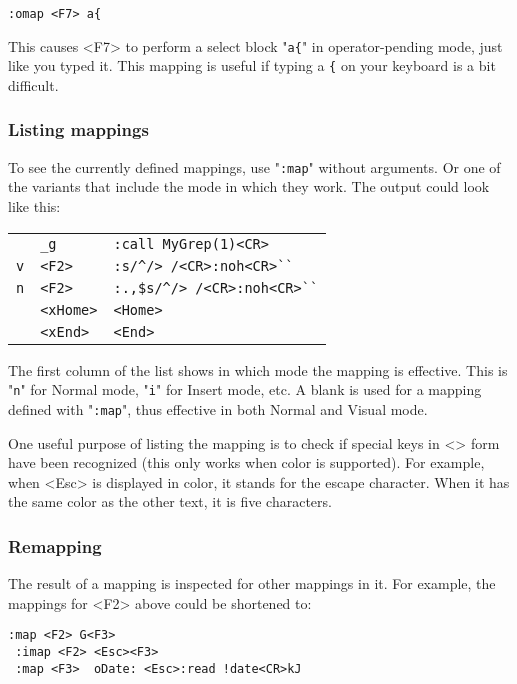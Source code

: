 \begin{Verbatim}[samepage=true]
 :omap <F7> a{
\end{Verbatim}

This causes <F7> to perform a select block "\verb!a{!" in operator-pending mode, just like you typed it.
This mapping is useful if typing a \verb!{! on your keyboard is a bit difficult.
\subsubsection{Listing mappings}
To see the currently defined mappings, use "\verb!:map!" without arguments.
Or one of the variants that include the mode in which they work.
The output could look like this:

\begin{center} \begin{tabular}{l l l}
				 & \verb!_g! & \verb!:call MyGrep(1)<CR>! \\
				\verb!v! &  \verb!<F2>! & \verb!:s/^/> /<CR>:noh<CR>``! \\
				\verb!n! &  \verb!<F2>! & \verb!:.,$s/^/> /<CR>:noh<CR>``! \\
				 & \verb!<xHome>! & \verb!<Home>! \\
				 & \verb!<xEnd>! & \verb!<End>! \\
\end{tabular} \end{center}

The first column of the list shows in which mode the mapping is effective.
This is "\verb!n!" for Normal mode, "\verb!i!" for Insert mode, etc.
A blank is used for a mapping defined with "\verb!:map!", thus effective in both Normal and Visual mode.

One useful purpose of listing the mapping is to check if special keys in <> form have been recognized (this only works when color is supported).
For example, when <Esc> is displayed in color, it stands for the escape character.
When it has the same color as the other text, it is five characters.

\subsubsection{Remapping}
The result of a mapping is inspected for other mappings in it.
For example, the mappings for <F2> above could be shortened to:

\begin{Verbatim}[samepage=true]
 :map <F2> G<F3>
 :imap <F2> <Esc><F3>
 :map <F3>  oDate: <Esc>:read !date<CR>kJ
\end{Verbatim}

